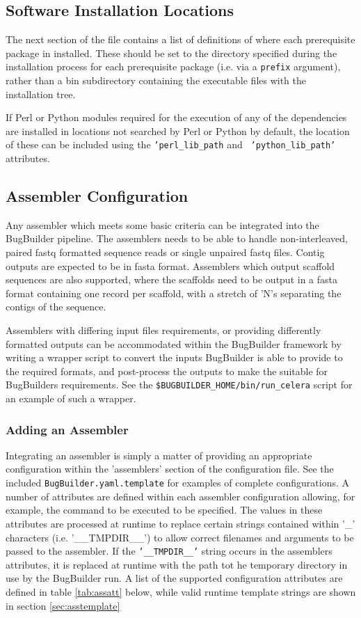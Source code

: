 \documentclass[a4paper,10pt]{article}
\begin{document}
\subsection{Software Installation Locations}
The next section of the file contains a list of definitions of where each
prerequisite package in installed. These should be set to the directory
specified during the installation process for each prerequisite package (i.e.
via a {\tt \-\-prefix} argument), rather than a bin subdirectory containing the
executable files with the installation tree.

If Perl or Python modules required for the execution of any of the dependencies
are installed in locations not searched by Perl or Python by default, the
location of these can be included using the {\tt 'perl\_lib\_path} and {\tt
'python\_lib\_path'} attributes.

\subsection{Assembler Configuration}
\label{sec:assemblerconf}

Any assembler which meets some basic criteria can be integrated into the
BugBuilder pipeline. The assemblers needs to be able to handle non-interleaved,
paired fastq formatted sequence reads or single unpaired fastq files. Contig
outputs are expected to be in fasta format. Assemblers which output scaffold
sequences are also supported, where the scaffolds need to be output in a fasta
format containing one record per scaffold, with a stretch of 'N's separating
the contigs of the sequence. 

Assemblers with differing input files requirements, or providing differently
formatted outputs can be accommodated within the BugBuilder framework by
writing a wrapper script to convert the inputs BugBuilder is able to provide to
the required formats, and post-process the outputs to make the suitable for
BugBuilders requirements. See the {\tt \$BUGBUILDER\_HOME/bin/run\_celera}
script for an example of such a wrapper.

\subsubsection{Adding an Assembler}

Integrating an assembler is simply a matter of providing an appropriate
configuration within the 'assemblers' section of the configuration file. See
the included {\tt BugBuilder.yaml.template} for examples of complete
configurations. A number of attributes are defined within each assembler
configuration allowing, for example,  the command to be executed to be
specified. The values in these attributes are processed at runtime to replace
certain strings contained within '\_' characters (i.e. '\_\_TMPDIR\_\_') to
allow correct filenames and arguments to be passed to the assembler. If the
{\tt '\_\_TMPDIR\_\_'} string occurs in the assemblers attributes, it is
replaced at runtime with the path tot he temporary directory in use by the
BugBuilder run. A list of the supported configuration attributes are defined in
table \ref{tab:assatt} below, while valid runtime template strings are shown in
section \ref{sec:asstemplate}
\end{document}
